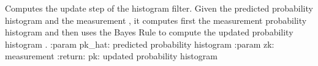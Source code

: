 \documentclass[letterpaper,10pt,english]{sphinxmanual}
\begin{document}
\begin{fulllineitems}
\begin{fulllineitems}
\label{\detokenize{HF:HF.HF.Update}}
\pysigstartsignatures
{}
\pysigstopsignatures
\sphinxAtStartPar
Computes the update step of the histogram filter. Given the predicted probability histogram  and the measurement , it computes first the measurement probability histogram  and then uses the Bayes Rule to compute the updated probability histogram .
:param pk\_hat: predicted probability histogram
:param zk: measurement
:return: pk: updated probability histogram

\end{fulllineitems}


\end{fulllineitems}

\end{document}
